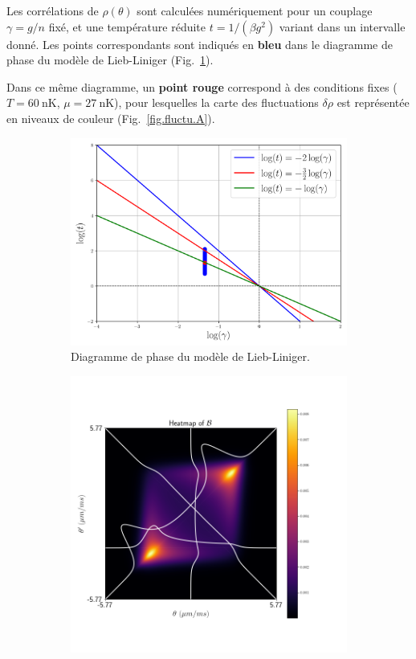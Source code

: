 Les corrélations de \( \rho(\theta) \) sont calculées numériquement pour un couplage \(\gamma = g/n\) fixé, et une température réduite \( t = 1 / (\beta g^2) \) variant dans un intervalle donné. Les points correspondants sont indiqués en \textbf{bleu} dans le diagramme de phase du modèle de Lieb-Liniger (Fig.~\ref{fig:diag}).

Dans ce même diagramme, un \textbf{point rouge} correspond à des conditions fixes (\(T = 60~\mathrm{nK}\), \( \mu = 27~\mathrm{nK} \)), pour lesquelles la carte des fluctuations \( \delta \rho \) est représentée en niveaux de couleur (Fig.~\ref{fig.fluctu.A}).


\begin{figure}[H]
	\centering
	\begin{subfigure}[b]{0.45\textwidth}
		\includegraphics[width=\textwidth]{Figures/diagram.png}
		\caption{Diagramme de phase du modèle de Lieb-Liniger.}
		\label{fig:diag}
	\end{subfigure}
	\hfill
	\begin{subfigure}[b]{0.45\textwidth}
		\includegraphics[width=\textwidth]{Figures/fluctu.png}

\end{subfigure}
\end{figure}
